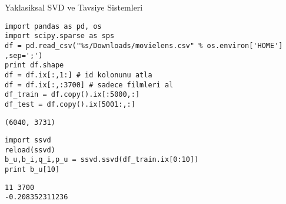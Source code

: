 \documentclass[12pt,fleqn]{article}\usepackage{../common}
\begin{document}
Yaklasiksal SVD ve Tavsiye Sistemleri

\begin{verbatim}
import pandas as pd, os
import scipy.sparse as sps
df = pd.read_csv("%s/Downloads/movielens.csv" % os.environ['HOME'] ,sep=';')
print df.shape
df = df.ix[:,1:] # id kolonunu atla
df = df.ix[:,:3700] # sadece filmleri al
df_train = df.copy().ix[:5000,:]
df_test = df.copy().ix[5001:,:]
\end{verbatim}

\begin{verbatim}
(6040, 3731)
\end{verbatim}












\begin{verbatim}
import ssvd
reload(ssvd)
b_u,b_i,q_i,p_u = ssvd.ssvd(df_train.ix[0:10])
print b_u[10]
\end{verbatim}

\begin{verbatim}
11 3700
-0.208352311236
\end{verbatim}
\end{document}
